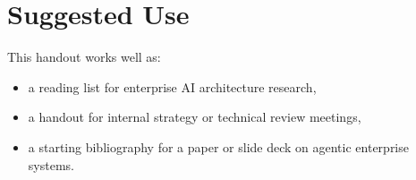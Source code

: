 \documentclass[11pt]{article}
\begin{document}
\section{Suggested Use}
This handout works well as:
\begin{itemize}[leftmargin=*]
    \item a reading list for enterprise AI architecture research,
    \item a handout for internal strategy or technical review meetings,
    \item a starting bibliography for a paper or slide deck on agentic enterprise systems.
\end{itemize}
\end{document}
